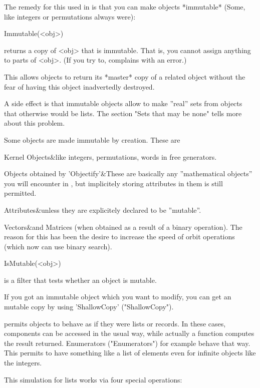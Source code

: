 The remedy for this used in {\GAP} is that you can make objects
*immutable*
(Some, like integers or permutations always were):

\>Immutable(<obj>)

returns a copy of <obj> that is immutable. That is, you cannot assign
anything to parts of <obj>. (If you try to, {\GAP} complains with an error.)

This allows objects to return its *master* copy of a related object without
the fear of having this object inadvertedly destroyed.

\danger
A side effect is that immutable objects allow to make ''real'' sets from 
objects that otherwise would be lists. The section "Sets that may be none"
tells more about this problem.

Some objects are made immutable by creation. These are

\beginitems
Kernel Objects&like integers, permutations, words in free generators. 

Objects obtained by 'Objectify'&These are basically any ''mathematical
objects'' you will encounter in {\GAP}, but implicitely storing attributes in
them is still permitted.

Attributes&unless they are explicitely declared to be ''mutable''.

Vectors&and Matrices (when obtained as a result of a binary operation). The
reason for this has been the desire to increase the speed of orbit
operations (which now can use binary search).
\enditems

\>IsMutable(<obj>)

is a filter that tests whether an object is mutable.

If you got an immutable object which you want to modify, you can get an
mutable copy by using 'ShallowCopy' ("ShallowCopy").


{\GAP} permits objects to behave as if they were lists or records. In these
cases, components can be accessed in the usual way, while actually a
function computes the result returned. Enumerators ("Enumerators") for
example behave that way. This permits to have something like a list of
elements even for infinite objects like the integers.

This simulation for lists works via four special operations:

\index{$\backslash[\backslash]$}


